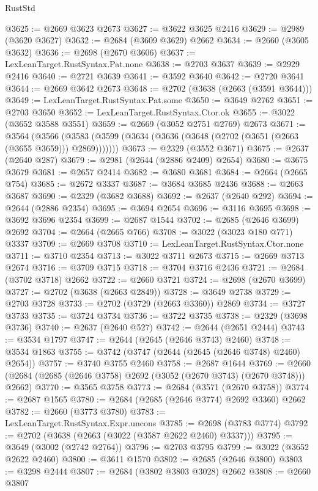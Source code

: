\begin{lexlean}{RustStd}
\begin{coremodule}
@3625 := @2669 @3623 @2673
@3627 := @3622 @3625 @2416
@3629 := @2989 (@3620 @3627)
@3632 := @2684 (@3609 @3629) @2662
@3634 := @2660 (@3605 @3632)
@3636 := @2698 (@2670 @3606)
@3637 := LexLeanTarget.RustSyntax.Pat.none
@3638 := @2703 @3637
@3639 := @2929 @2416
@3640 := @2721 @3639
@3641 := @3592 @3640
@3642 := @2720 @3641
@3644 := @2669 @3642 @2673
@3648 := @2702 (@3638 (@2663 (@3591 @3644)))
@3649 := LexLeanTarget.RustSyntax.Pat.some
@3650 := @3649 @2762
@3651 := @2703 @3650
@3652 := LexLeanTarget.RustSyntax.Ctor.ok
@3655 := @3022 (@3652 @3588 @3551)
@3659 := @2669 (@3052 @2751 @2769) @2673
@3671 := @3564
    (@3566 (@3583 (@3599 (@3634 (@3636 (@3648 (@2702 (@3651 (@2663 (@3655 @3659))) @2869)))))))
@3673 := @2329 (@3552 @3671)
@3675 := @2637 (@2640 @287)
@3679 := @2981 (@2644 (@2886 @2409) @2654)
@3680 := @3675 @3679
@3681 := @2657 @2414
@3682 := @3680 @3681
@3684 := @2664 (@2665 @754)
@3685 := @2672 @3337
@3687 := @3684 @3685 @2436
@3688 := @2663 @3687
@3690 := @2329 (@3682 @3688)
@3692 := @2637 (@2640 @292)
@3694 := @2644 (@2886 @2354)
@3695 := @3694 @2654
@3696 := @3116 @3695
@3698 := @3692 @3696 @2354
@3699 := @2687 @1544
@3702 := @2685 (@2646 @3699) @2692
@3704 := @2664 (@2665 @766)
@3708 := @3022 (@3023 @180 @771) @3337
@3709 := @2669 @3708
@3710 := LexLeanTarget.RustSyntax.Ctor.none
@3711 := @3710 @2354
@3713 := @3022 @3711 @2673
@3715 := @2669 @3713 @2674
@3716 := @3709 @3715
@3718 := @3704 @3716 @2436
@3721 := @2684 (@3702 @3718) @2662
@3722 := @2660 @3721
@3724 := @2698 (@2670 @3699)
@3727 := @2702 (@3638 (@2663 @2849))
@3728 := @3649 @2738
@3729 := @2703 @3728
@3733 := @2702 (@3729 (@2663 @3360)) @2869
@3734 := @3727 @3733
@3735 := @3724 @3734
@3736 := @3722 @3735
@3738 := @2329 (@3698 @3736)
@3740 := @2637 (@2640 @527)
@3742 := @2644 (@2651 @2444)
@3743 := @3534 @1797
@3747 := @2644 (@2645 (@2646 @3743) @2460)
@3748 := @3534 @1863
@3755 := @3742 (@3747 (@2644 (@2645 (@2646 @3748) @2460) @2654))
@3757 := @3740 @3755 @2460
@3758 := @2687 @1644
@3769 := @2660 (@2684 (@2685 (@2646 @3758) @2692 (@3052 (@2670 @3743) (@2670 @3748))) @2662)
@3770 := @3565 @3758
@3773 := @2684 (@3571 (@2670 @3758))
@3774 := @2687 @1565
@3780 := @2684 (@2685 (@2646 @3774) @2692 @3360) @2662
@3782 := @2660 (@3773 @3780)
@3783 := LexLeanTarget.RustSyntax.Expr.uncons
@3785 := @2698 (@3783 @3774)
@3792 := @2702 (@3638 (@2663 (@3022 (@3587 @2622 @2460) @3337)))
@3795 := @3649 (@3002 (@2742 @2764))
@3796 := @2703 @3795
@3799 := @3022 (@3652 @2622 @2460)
@3800 := @3611 @1570
@3802 := @2685 (@2646 @3800)
@3803 := @3298 @2444
@3807 := @2684 (@3802 @3803 @3028) @2662
@3808 := @2660 @3807

\end{coremodule}
\end{lexlean}
